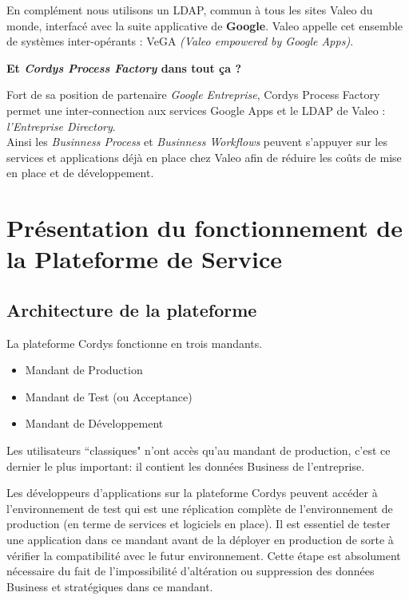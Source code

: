 En complément nous utilisons un LDAP, commun à tous les sites Valeo du monde, interfacé avec la suite applicative de \textbf{Google}. Valeo appelle cet ensemble de systèmes inter-opérants  : VeGA \textit{(Valeo empowered by Google Apps)}.

\clearpage

\textbf{Et \textit{Cordys Process Factory} dans tout ça ?}

Fort de sa position de partenaire \emph{Google Entreprise}, Cordys Process Factory permet une inter-connection aux services Google Apps  et le LDAP de Valeo : \textit{l'Entreprise Directory}.\\
Ainsi les \textit{Businness Process} et \textit{Businness Workflows} peuvent s'appuyer sur les services et applications déjà en place chez Valeo afin de réduire les coûts de mise en place et de développement.

\clearpage

\section{Présentation du fonctionnement de la Plateforme de Service}

\subsection{Architecture de la plateforme }

La plateforme Cordys fonctionne en trois mandants.
\vspace{4mm}
\begin{itemize}
	\item Mandant de Production
	\item Mandant de Test (ou Acceptance)
	\item Mandant de Développement
\end{itemize}
\vspace{4mm}

Les utilisateurs ``classiques" n'ont accès qu'au mandant de production, c'est ce dernier le plus important: il contient les données Business de l'entreprise.

Les développeurs d'applications sur la plateforme Cordys peuvent accéder à l'environnement de test qui est une réplication complète de l'environnement de production (en terme de services et logiciels en place). Il est essentiel de tester une application dans ce mandant avant de la déployer en production de sorte à vérifier la compatibilité avec le futur environnement. Cette étape est absolument nécessaire du fait de l'impossibilité d'altération ou suppression des données Business et stratégiques dans ce mandant.

